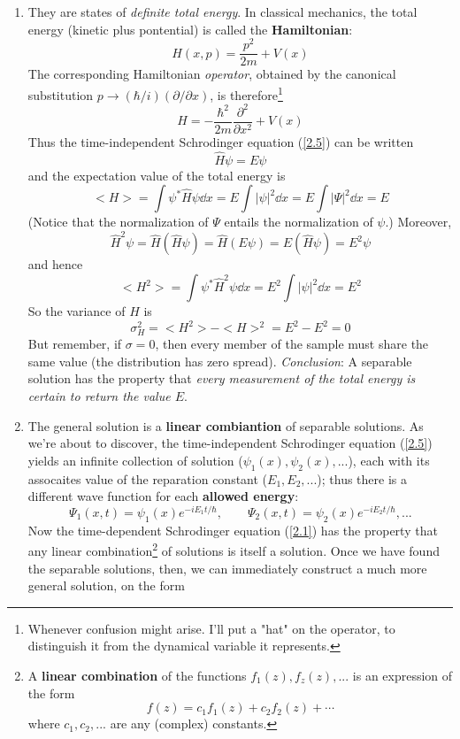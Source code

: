 \begin{enumerate}
\item They are states of \textit{definite total energy}. In classical mechanics, the total energy (kinetic plus pontential) is called the \textbf{Hamiltonian}:
	\begin{equation}\label{2.10}
	H(x,p)=\frac{p^2}{2m}+V(x)
\end{equation}
The corresponding Hamiltonian \textit{operator}, obtained by the canonical substitution $p\to (\hbar/i)(\partial /\partial x)$, is therefore\footnote{Whenever confusion might arise. I'll put a "hat" on the operator, to distinguish it from the dynamical variable it represents.}
\begin{equation}\label{2.11}
	\hat{H}=-\frac{\hbar^2}{2m}\frac{\partial^2}{\partial x^2}+V(x)
\end{equation}
Thus the time-independent Schrodinger equation (\ref{2.5}) can be written
\begin{equation}\label{2.12}
	\hat{H}\psi=E\psi
\end{equation}
and the expectation value of the total energy is
\begin{equation}\label{2.13}
	<H>=\int\psi^*\hat{H}\psi\dd x=E\int |\psi|^2\dd x=E\int |\Psi|^2\dd x=E
\end{equation}
(Notice that the normalization of $\Psi$ entails the normalization of $\psi$.) Moreover,
$$\hat{H}^2\psi=\hat{H}(\hat{H}\psi)=\hat{H}(E\psi)=E(\hat{H}\psi)=E^2\psi$$ and hence $$<H^2>=\int\psi^*\hat{H}^2\psi\dd x=E^2\int|\psi|^2\dd x=E^2$$ So the variance of $H$ is 
\begin{equation}\label{2.14}
	\sigma_H^2=<H^2>-<H>^2=E^2-E^2=0
\end{equation}
But remember, if $\sigma=0$, then every member of the sample must share the same value (the distribution has zero spread). \textit{Conclusion}: A separable solution has the property that \textit{every measurement of the total energy is certain to return the value $E$}.

\item The general solution is a \textbf{linear combiantion} of separable solutions. As we're about to discover, the time-independent Schrodinger equation (\ref{2.5}) yields an infinite collection of solution ($\psi_1(x), \psi_2(x),...$),  each with its assocaites value of the reparation constant ($E_1, E_2, ...$); thus there is a different wave function for each \textbf{allowed energy}:
	$$\Psi_1(x,t)=\psi_1(x)e^{-iE_1t/\hbar},\qquad \Psi_2(x,t)=\psi_2(x)e^{-iE_2t/\hbar}, ...$$ Now the time-dependent Schrodinger equation (\ref{2.1}) has the property that any linear combination\footnote{A \textbf{linear combination} of the functions $f_1(z), f_z(z),...$ is an expression of the form $$f(z)=c_1f_1(z)+c_2f_2(z)+\cdots$$ where $c_1,c_2,...$ are any (complex) constants.} of solutions is itself a solution. Once we have found the separable solutions, then, we can immediately construct a much more general solution, on the form
\end{enumerate}
